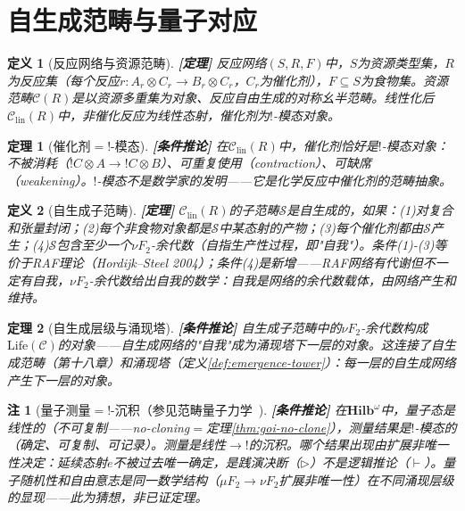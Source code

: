 \documentclass[11pt,a4paper]{article}
\newtheorem{definition}{定义}
\newtheorem{theorem}{定理}
\newtheorem{remark}{注}
\newcommand{\lvl}[1]{\hfill\textbf{\footnotesize[#1]}}
\newcommand{\lvP}{\lvl{定理}}
\newcommand{\lvC}{\lvl{条件推论}}
\newcommand{\bang}{{!}}
\begin{document}
\section{自生成范畴与量子对应}

\begin{definition}[反应网络与资源范畴]\label{def:reaction-network}\lvP
反应网络$(S,R,F)$中，$S$为资源类型集，$R$为反应集（每个反应$r:A_r\otimes C_r\to B_r\otimes C_r$，$C_r$为催化剂），$F\subseteq S$为食物集。资源范畴$\mathcal{C}(R)$是以资源多重集为对象、反应自由生成的对称幺半范畴。线性化后$\mathcal{C}_{\mathrm{lin}}(R)$中，非催化反应为线性态射，催化剂为$\bang$-模态对象。
\end{definition}

\begin{theorem}[催化剂$=\bang$-模态]\label{thm:catalyst-bang}\lvC
在$\mathcal{C}_{\mathrm{lin}}(R)$中，催化剂恰好是$\bang$-模态对象：不被消耗（$\bang C\otimes A\to\bang C\otimes B$）、可重复使用（contraction）、可缺席（weakening）。$\bang$-模态不是数学家的发明——它是化学反应中催化剂的范畴抽象。
\end{theorem}

\begin{definition}[自生成子范畴]\label{def:self-generating-subcat}\lvP
$\mathcal{C}_{\mathrm{lin}}(R)$的子范畴$\mathcal{S}$是自生成的，如果：(1)对复合和张量封闭；(2)每个非食物对象都是$\mathcal{S}$中某态射的产物；(3)每个催化剂都由$\mathcal{S}$产生；(4)$\mathcal{S}$包含至少一个$\nu F_2$-余代数（自指生产性过程，即"自我"）。条件(1)-(3)等价于RAF理论（Hordijk--Steel 2004）；条件(4)是新增——RAF网络有代谢但不一定有自我，$\nu F_2$-余代数给出自我的数学：自我是网络的余代数载体，由网络产生和维持。
\end{definition}

\begin{theorem}[自生成层级与涌现塔]\label{thm:selfgen-tower}\lvC
自生成子范畴中的$\nu F_2$-余代数构成$\mathrm{Life}(\mathcal{C})$的对象——自生成网络的"自我"成为涌现塔下一层的对象。这连接了自生成范畴（第十八章）和涌现塔（定义\ref{def:emergence-tower}）：每一层的自生成网络产生下一层的对象。
\end{theorem}

\begin{remark}[量子测量$=\bang$-沉积（参见范畴量子力学~\cite{abramsky04}]\lvC
在$\mathbf{Hilb}^\omega$中，量子态是线性的（不可复制——no-cloning$=$定理\ref{thm:goi-no-clone}），测量结果是$\bang$-模态的（确定、可复制、可记录）。测量是线性$\to\bang$的沉积。哪个结果出现由扩展非唯一性决定：延续态射$e$不被过去唯一确定，是践演决断（$\triangleright$）不是逻辑推论（$\vdash$）。量子随机性和自由意志是同一数学结构（$\mu F_2\to\nu F_2$扩展非唯一性）在不同涌现层级的显现——此为猜想，非已证定理。
\end{remark}
\end{document}
